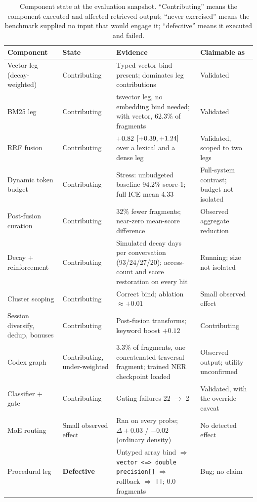 \documentclass[11pt,a4paper]{article}
\renewcommand{\arraystretch}{1.15}
\begin{document}
\begin{table}[htbp]
\centering
\footnotesize
\renewcommand{\arraystretch}{1.04}
\caption{Component state at the evaluation snapshot. ``Contributing'' means the component executed and affected retrieved output; ``never exercised'' means the benchmark supplied no input that would engage it; ``defective'' means it executed and failed.}
\label{tab:fidelity}
\begin{tabular}{@{}L{2.6cm}L{2.0cm}L{5.1cm}L{2.9cm}@{}}
\toprule
\textbf{Component} & \textbf{State} & \textbf{Evidence} & \textbf{Claimable as} \\
\midrule
Vector leg (decay-weighted) & Contributing & Typed vector bind present; dominates leg contributions & Validated \\
BM25 leg & Contributing & tsvector leg, no embedding bind needed; with vector, 62.3\% of fragments & Validated \\
RRF fusion & Contributing & $+0.82$ $[+0.39,+1.24]$ over a lexical and a dense leg & Validated, scoped to two legs \\
Dynamic token budget & Contributing & Stress: unbudgeted baseline 94.2\% score-1; full ICE mean 4.33 & Full-system contrast; budget not isolated \\
Post-fusion curation & Contributing & 32\% fewer fragments; near-zero mean-score difference & Observed aggregate reduction \\
Decay + reinforcement & Contributing & Simulated decay days per conversation (93/24/27/20); access-count and score restoration on every hit & Running; size not isolated \\
Cluster scoping & Contributing & Correct bind; ablation $\approx +0.01$ & Small observed effect \\
Session diversify, dedup, bonuses & Contributing & Post-fusion transforms; keyword boost $+0.12$ & Contributing \\
Codex graph & Contributing, under-weighted & 3.3\% of fragments, one concatenated traversal fragment; trained NER checkpoint loaded & Observed output; utility unconfirmed \\
Classifier + gate & Contributing & Gating failures 22 $\to$ 2 & Validated, with the override caveat \\
MoE routing & Small observed effect & Ran on every probe; $\Delta +0.03$ / $-0.02$ (ordinary density) & No detected effect \\
\midrule
Procedural leg & \textbf{Defective} & Untyped array bind $\Rightarrow$ \texttt{vector <=> double precision[]} $\Rightarrow$ rollback $\Rightarrow$ \texttt{[]}; 0.0 fragments & Bug; no claim \\

\end{tabular}
\end{table}
\end{document}
